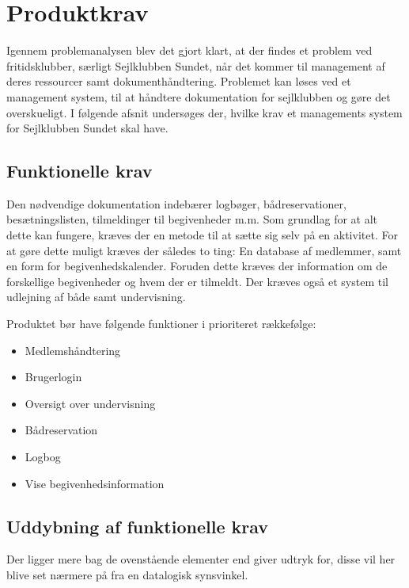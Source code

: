\chapter{Produktkrav}

Igennem problemanalysen blev det gjort klart, at der findes et problem ved fritidsklubber, særligt Sejlklubben Sundet, når det kommer til management af deres ressourcer samt dokumenthåndtering. 
Problemet kan løses ved et management system, til at håndtere dokumentation for sejlklubben og gøre det overskueligt. 
I følgende afsnit undersøges der, hvilke krav et managements system for Sejlklubben Sundet skal have. 


\section{Funktionelle krav} \label{sec:funktionelleKrav}

Den nødvendige dokumentation indebærer logbøger, bådreservationer, besætningslisten, tilmeldinger til begivenheder m.m. 
Som grundlag for at alt dette kan fungere, kræves der en metode til at sætte sig selv på en aktivitet. 
For at gøre dette muligt kræves der således to ting: En database af medlemmer, samt en form for begivenhedskalender. 
Foruden dette kræves der information om de forskellige begivenheder og hvem der er tilmeldt. 
Der kræves også et system til udlejning af både samt undervisning.

Produktet bør have følgende funktioner i prioriteret rækkefølge:
\begin{itemize}
  \item Medlemshåndtering
  \item Brugerlogin
  \item Oversigt over undervisning
  \item Bådreservation
  \item Logbog
  \item Vise begivenhedsinformation
\end{itemize}



\section{Uddybning af funktionelle krav}

Der ligger mere bag de ovenstående elementer end  giver udtryk for, disse vil her blive set nærmere på fra en datalogisk synsvinkel. 

